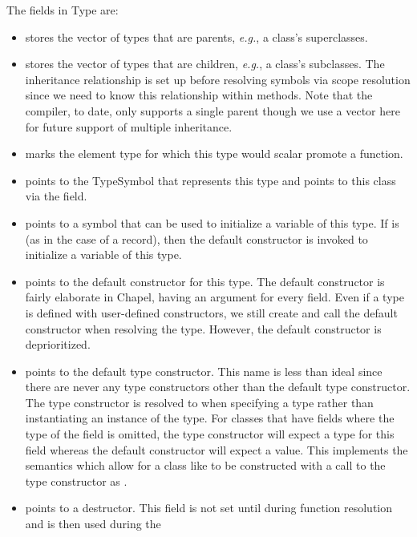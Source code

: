 \documentclass[10pt]{article}
\newcommand{\eg}{\emph{e.g.}}
\begin{document}
The fields in Type are:
\begin{itemize}
\item {} stores the vector of types that
  are parents, \eg, a class's superclasses.
\item {} stores the vector of types that
  are children, \eg, a class's subclasses.  The inheritance
  relationship is set up before resolving symbols via scope resolution
  since we need to know this relationship within methods.  Note that
  the compiler, to date, only supports a single parent though we use a
  vector here for future support of multiple inheritance.
\item {} marks the element type for which
  this type would scalar promote a function.
\item {} points to the TypeSymbol that represents
  this type and points to this class via the  field.
\item {} points to a symbol that can be used to
  initialize a variable of this type.  If  is
   (as in the case of a record), then the default constructor
  is invoked to initialize a variable of this type.
\item {} points to the default
  constructor for this type.  The default constructor is fairly
  elaborate in Chapel, having an argument for every field.  Even if a
  type is defined with user-defined constructors, we still create and
  call the default constructor when resolving the type.  However, the
  default constructor is deprioritized.
\item {} points to the default type
  constructor.  This name is less than ideal since there are never any
  type constructors other than the default type constructor.  The type
  constructor is resolved to when specifying a type rather than
  instantiating an instance of the type.  For classes that have fields
  where the type of the field is omitted, the type constructor will
  expect a type for this field whereas the default constructor will
  expect a value.  This implements the semantics which allow for a
  class like  to be constructed with a call
  to the type constructor as .
\item {} points to a destructor.  This field is
  not set until during function resolution and is then used during the

\end{itemize}
\end{document}
